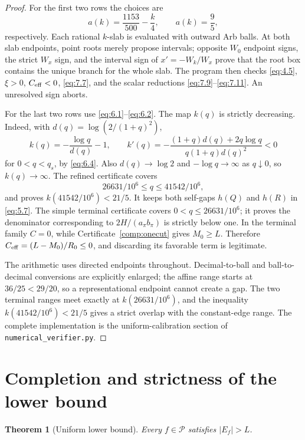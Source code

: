 \documentclass[11pt]{article}
\numberwithin{equation}{section}
\theoremstyle{plain}
\newtheorem{theorem}{Theorem}[section]
\theoremstyle{definition}
\theoremstyle{remark}
\newcommand{\1}{\mathbf 1}
\begin{document}
\begin{proof}
For the first two rows the choices are
\[
 a(k)=\frac{1153}{500}-\frac k4,\qquad
 a(k)=\frac95,
\]
respectively.  Each rational $k$-slab is evaluated with outward Arb balls.
At both slab endpoints, point roots merely propose intervals; opposite
$W_0$ endpoint signs, the strict $W_x$ sign, and the interval sign of
$x'=-W_k/W_x$ prove that the root box contains the unique branch for the
whole slab.  The program then checks \eqref{eq:4.5}, $\xi>0$, $C_{\rm eff}<0$,
\eqref{eq:7.7}, and the scalar reductions \eqref{eq:7.9}--\eqref{eq:7.11}.  An unresolved sign aborts.

For the last two rows use \eqref{eq:6.1}--\eqref{eq:6.2}.  The map $k(q)$ is strictly
decreasing.  Indeed, with $d(q)=\log(2/(1+q)^2)$,
\[
 k(q)=-\frac{\log q}{d(q)}-1,\qquad
 k'(q)=-\frac{(1+q)d(q)+2q\log q}
 {q(1+q)d(q)^2}<0
\]
for $0<q<q_s$, by \eqref{eq:6.4}.  Also $d(q)\to\log2$ and
$-\log q\to\infty$ as $q\downarrow0$, so $k(q)\to\infty$.  The refined
certificate covers
\[
 26631/10^6\le q\le41542/10^6,
\]
and proves $k(41542/10^6)<21/5$.  It keeps both self-gaps $h(Q)$ and
$h(R)$ in \eqref{eq:5.7}.  The simple terminal certificate covers
$0<q\le26631/10^6$; it proves the denominator corresponding to
$2H/(a_\pi b_\pi)$ is strictly below one.  In the terminal family
$C=0$, while Certificate~\ref{comp:onecut} gives $M_0\ge L$.
Therefore $C_{\rm eff}=(L-M_0)/R_0\le0$, and discarding its favorable
term is legitimate.

The arithmetic uses directed endpoints throughout.  Decimal-to-ball and
ball-to-decimal conversions are explicitly enlarged; the affine range
starts at $36/25<29/20$, so a representational endpoint cannot create a
gap.  The two terminal ranges meet exactly at $k(26631/10^6)$, and the
inequality $k(41542/10^6)<21/5$ gives a strict overlap with the
constant-edge range.  The complete implementation is the
uniform-calibration section of \texttt{numerical\_verifier.py}.
\end{proof}
\section{Completion and strictness of the lower bound}\label{sec:lower}

\begin{theorem}[Uniform lower bound]\label{thm:lower}
Every $f\in\mathcal P$ satisfies $|E_f|>L$.
\end{theorem}
\end{document}
